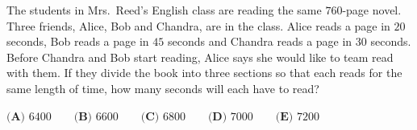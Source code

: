The students in Mrs.\ Reed's English class are reading the same $760$-page novel. Three friends, Alice, Bob and Chandra, are in the class. Alice reads a page in $20$ seconds, Bob reads a page in $45$ seconds and Chandra reads a page in $30$ seconds. Before Chandra and Bob start reading, Alice says she would like to team read with them. If they divide the book into three sections so that each reads for the same length of time, how many seconds will each have to read?

$\textbf{(A) } 6400 \qquad \textbf{(B) } 6600 \qquad \textbf{(C) } 6800 \qquad \textbf{(D) } 7000 \qquad \textbf{(E) } 7200$

